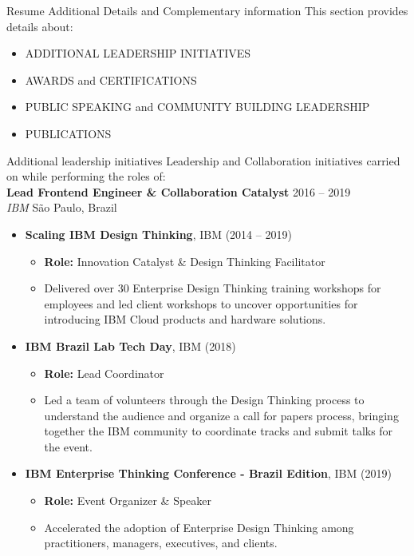 \documentclass{resume} %
\begin{document}
\hfill \break
\begin{rSection}{Resume Additional Details and Complementary information} 
This section provides details about: 
\begin{itemize}
    \item ADDITIONAL LEADERSHIP INITIATIVES
    \item AWARDS and CERTIFICATIONS
    \item PUBLIC SPEAKING and COMMUNITY BUILDING LEADERSHIP
    \item PUBLICATIONS
\end{itemize}    
\end{rSection}

\begin{rSection}{Additional leadership initiatives} 
Leadership and Collaboration initiatives carried on while performing the roles of:\\

\textbf {Lead Frontend Engineer \& Collaboration Catalyst} \hfill 2016 -- 2019\\
\textit{IBM} \hfill São Paulo, Brazil\\
\begin{itemize}
    \item \textbf{Scaling IBM Design Thinking}, \hfill IBM (2014 -- 2019) 
    \begin{itemize}
        \item \textbf{Role:} Innovation Catalyst \& Design Thinking Facilitator
        \item Delivered over 30 Enterprise Design Thinking training workshops for employees and led client workshops to uncover opportunities for introducing IBM Cloud products and hardware solutions.
    \end{itemize}
    
    \item \textbf{IBM Brazil Lab Tech Day}, \hfill IBM (2018) 
    \begin{itemize}
        \item \textbf{Role:} Lead Coordinator
        \item Led a team of volunteers through the Design Thinking process to understand the audience and organize a call for papers process, bringing together the IBM community to coordinate tracks and submit talks for the event.
    \end{itemize}
    
    \item \textbf{IBM Enterprise Thinking Conference - Brazil Edition}, \hfill IBM (2019) 
    \begin{itemize}
        \item \textbf{Role:} Event Organizer \& Speaker
        \item Accelerated the adoption of Enterprise Design Thinking among practitioners, managers, executives, and clients.
    \end{itemize}
    

\end{itemize}
\end{rSection}
\end{document}
